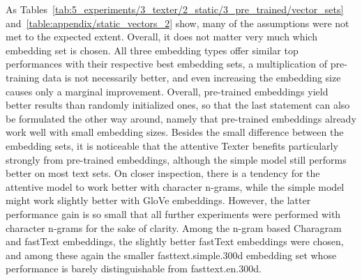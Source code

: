 As Tables~\ref{tab:5_experiments/3_texter/2_static/3_pre_trained/vector_sets} and~\ref{table:appendix/static_vectors_2} show, many of the assumptions were not met to the expected extent. Overall, it does not matter very much which embedding set is chosen. All three embedding types offer similar top performances with their respective best embedding sets, a multiplication of pre-training data is not necessarily better, and even increasing the embedding size causes only a marginal improvement. Overall, pre-trained embeddings yield better results than randomly initialized ones, so that the last statement can also be formulated the other way around, namely that pre-trained embeddings already work well with small embedding sizes. Besides the small difference between the embedding sets, it is noticeable that the attentive Texter benefits particularly strongly from pre-trained embeddings, although the simple model still performs better on most text sets. On closer inspection, there is a tendency for the attentive model to work better with character n-grams, while the simple model might work slightly better with GloVe embeddings. However, the latter performance gain is so small that all further experiments were performed with character n-grams for the sake of clarity. Among the n-gram based Charagram and fastText embeddings, the slightly better fastText embeddings were chosen, and among these again the smaller fasttext.simple.300d embedding set whose performance is barely distinguishable from fasttext.en.300d.

